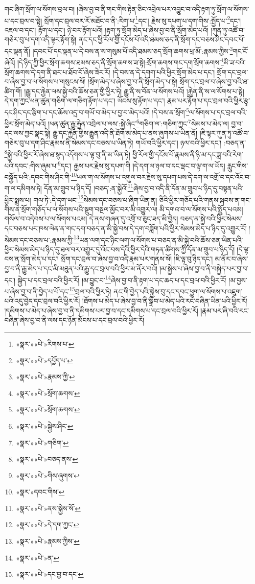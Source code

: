 གང་ཞིག་སྲོག་ལ་སོགས་བྲལ་བ། །ཞེས་བྱ་བ་ནི་གང་གིས་རྟེན་ཅིང་འབྲེལ་པར་འབྱུང་བ་འདི་རྟག་ཏུ་སྲོག་ལ་སོགས་པ་དང་བྲལ་བ་སྟེ། སྲོག་དང་བྲལ་བར་རོ་མཐོང་བ་ནི་:རིག་པ་\footnote{«སྣར་»«པེ་»རིགས་པ་}དང་། རྗེས་སུ་དཔག་པ་དག་གིས་:སྤྱོད་པ་\footnote{«སྣར་»«པེ་»དཔྱོད་པ་}དང་། འཇལ་བ་དང་། རྟོག་པ་དང་། ཉེ་བར་རྟོག་པའོ། །རྟག་ཏུ་སྲོག་མེད་པ་ཞེས་བྱ་བ་ནི་སྲོག་མེད་པའོ། །ཀུན་ཏུ་འཚོ་བ་གཅེར་བུ་པ་དག་འདི་ལྟར་རྟོག་སྟེ། ནང་དང་ཕྱི་རོལ་གྱི་དངོས་པོ་འདི་ཐམས་ཅད་ནི་སྲོག་དང་བཅས་ཤིང་དབང་པོ་དང་ལྡན་ནོ། །དབང་པོ་དང་ལྡན་པ་དེ་བས་ན་ས་གསུམ་པོ་འདི་ཐམས་ཅད་སྲོག་ཆགས་ཕྲ་མོ་:རྣམས་ཀྱིས་\footnote{«སྣར་»«པེ་»རྣམས་ཀྱི་}གང་ངོ་ཞེའོ། །དེ་ཉིད་ཀྱི་ཕྱིར་སྲོག་ཆགས་ཐམས་ཅད་ནི་སྲོག་ཆགས་ཟ་སྟེ།:སྲོག་ཆགས་གང་དག་སྲོག་ཆགས་\footnote{«སྣར་»«པེ་»སྲོག་ཆགས་}མི་ཟ་བའི་སྲོག་ཆགས་དེ་དག་ནི་ཐར་པ་ཐོབ་བོ་ཞེས་ཟེར་རོ། །དེ་བས་ན་དེ་དགག་པའི་ཕྱིར་སྲོག་མེད་པ་དང་། སྲོག་དང་བྲལ་བ་ཞེས་བྱ་བ་ལ་སོགས་པ་གསུངས་སོ། །སྲོག་མེད་པ་ཞེས་བྱ་བ་ནི་སྲོག་མེད་པ་སྟེ། སྲོག་དང་བྲལ་བ་ཞེས་བྱ་བའི་ཐ་ཚིག་གོ། །རྒྱུ་དང་རྐྱེན་ལས་སྐྱེ་བའི་ཆོས་ཅན་གྱི་ཕྱིར་ཏེ། རྒྱུ་ནི་ས་བོན་ལ་སོགས་པའོ། །རྐྱེན་ནི་ས་ལ་སོགས་པ་སྟེ། དེ་དག་ཀྱང་ཕན་ཚུན་གཅིག་ལ་གཅིག་རྟོག་པ་དང་། ཡོངས་སུ་རྟོག་པ་དང་། རྣམ་པར་རྟོག་པ་དང་བྲལ་བའི་ཕྱིར་རྩྭ་དང་ཤིང་དང་རྩིག་པ་དང་ཆོས་འདྲ་བ་གཡོ་བ་མེད་པ་བྱ་བ་མེད་པའོ། །དེ་བས་ན་སྲོག་\footnote{«སྣར་»«པེ་»སྲོག་ཆགས་}ལ་སོགས་པ་དང་བྲལ་བའི་ཕྱིར་སྲོག་མེད་པའོ། །ཕན་ཚུན་རྒྱུ་རྐྱེན་འབྲེལ་པ་ལས་:སྐྱེ་ཞིང་\footnote{«སྣར་»«པེ་»སྐྱེས་ཤིང་}གཅིག་ལ་:གཅིག་ཀྱང་\footnote{«སྣར་»«པེ་»གཅིག་}སེམས་པ་མེད་ལ། བྱ་བ་དང་ལས་ཀྱང་སྣང་སྟེ། རྒྱུ་དང་རྐྱེན་གྱིས་རྒྱུན་འདི་ནི་ཐོག་མ་མེད་པ་ནས་ཞུགས་པ་ཡིན་ནོ། །ཇི་ལྟར་ཀུན་ཏུ་འཚོ་བ་གཅེར་བུ་པ་དག་ཤིང་རྣམས་ནི་སེམས་དང་བཅས་པ་ཡིན་ཏེ། གཡོ་བའི་ཕྱིར་དང་། ཉལ་བའི་ཕྱིར་དང་། :བཅད་ན་\footnote{«སྣར་»«པེ་»བཅད་ནས་}སྐྱེ་བའི་ཕྱིར་རོ་ཞེས་ཐ་སྙད་འདོགས་པ་ལྟ་བུ་ནི་མ་ཡིན་ཏེ། ཕྱི་རོལ་གྱི་དངོས་པོ་རྣམས་ནི་ཉི་མ་དང་ཟླ་བའི་རེག་པའི་དབང་:གིས་ཞུམ་པ་\footnote{«སྣར་»«པེ་»གིས་ཞུགས་}དང་། རྒྱས་པར་རྗེས་སུ་དཔག་གི །དེ་དག་ལ་ཉལ་བ་དང་ལྡང་བ་ལྟ་ག་ལ་ཡོད། རླུང་གིས་བསྐྱོད་པའི་:དབང་གིས་ཤིང་གི་\footnote{«སྣར་»དབང་གིས་}ཡལ་ག་ལ་སོགས་པ་འགུལ་བར་རྗེས་སུ་དཔག་པས་དེ་དག་ལ་འགྲོ་བ་དང་འོང་བ་ག་ལ་དམིགས་ཏེ། དོན་མ་གྲུབ་པ་ཉིད་དོ། །བཅད་:ན་སྐྱེའོ་\footnote{«སྣར་»«པེ་»ནས་སྐྱེས་སོ་}ཞེས་བྱ་བ་འདི་ནི་དོན་མ་གྲུབ་པ་ཉིད་དུ་བསྟན་པའི་ཕྱིར་སྨྲས་པ། གལ་ཏེ་:དེ་དག་ཡང་\footnote{«སྣར་»«པེ་»དེ་དག་ཀྱང་}སེམས་དང་བཅས་པ་ཞིག་ཡིན་ན། ཅིའི་ཕྱིར་གཅོད་པའི་གནས་སྐབས་ན་གང་གིས་ན་སྲོག་གཅོད་པ་ལ་སོགས་པའི་སྡུག་བསྔལ་མྱོང་བར་མི་འགྱུར་ལ། མི་དགའ་བ་ལ་སོགས་པའི་སྤྱོད་པའམ། གསོལ་བ་འདེབས་པ་ལ་སོགས་པའམ། དེ་ནས་གཞན་དུ་འགྲོ་བ་ཅུང་ཟད་མི་བྱེད། བཅད་ན་སྐྱེ་བའི་ཕྱིར་སེམས་དང་བཅས་པར་ཁས་ལེན་ན་གང་དག་བཅད་ན་མི་སྐྱེ་བས་དེ་དག་བཟློག་པའི་ཕྱིར་སེམས་མེད་པ་ཉིད་དུ་འགྱུར་རོ། །སེམས་དང་བཅས་པ་:རྣམས་ཀྱི་\footnote{«སྣར་»«པེ་»རྣམས་ཀྱིས་}ཡན་ལག་དང་ཉིང་ལག་ལ་སོགས་པ་བཅད་ན་མི་སྐྱེ་བའི་ཆོས་ཅན་ཡིན་པའི་ཕྱིར་སེམས་མེད་པ་ཉིད་དུ་ཐལ་བར་འགྱུར་དུ་འོང་བས་དེའི་ཕྱིར་དེའི་གཏན་ཚིགས་ཀྱི་དོན་མ་གྲུབ་པ་ཉིད་དོ། །དེ་ལྟ་བས་ན་སྲོག་མེད་པ་དང་། སྲོག་དང་བྲལ་བ་ཞེས་བྱ་བ་འདི་རྣམ་པར་གནས་སོ། །ཇི་ལྟ་བུ་ཉིད་དང་། མ་ནོར་བ་ཞེས་བྱ་བ་ནི་རྒྱུ་མེད་པ་དང་མི་མཐུན་པའི་རྒྱུ་དང་བྲལ་བའི་ཕྱིར་མ་ནོར་བའོ། །མ་སྐྱེས་པ་ཞེས་བྱ་བ་ནི་བསྐྱེད་པར་བྱ་བ་དང་། སྐྱེད་པ་དང་བྲལ་བའི་ཕྱིར་རོ། །མ་བྱུང་བ་\footnote{«སྣར་»«པེ་»ན་}ཞེས་བྱ་བ་ནི་རྟག་པ་དང་ཆད་པ་དང་བྲལ་བའི་ཕྱིར་རོ། །མ་བྱས་པ་ཞེས་བྱ་བ་ནི་བྱེད་པ་པོ་དང་\footnote{«སྣར་»«པེ་»དང་བྱ་བ་དང་}བྲལ་བའི་ཕྱིར་ཏེ། ནང་གི་བྱེད་པའི་སྐྱེས་བུ་དང་དབང་ཕྱུག་ལ་སོགས་པ་འཇུག་པའི་འདུ་བྱེད་དང་བྲལ་བའི་ཕྱིར་རོ། །ཐོགས་པ་མེད་པ་ཞེས་བྱ་བ་ནི་སྒྲིབ་པ་མེད་པའི་རང་བཞིན་ཡིན་པའི་ཕྱིར་རོ། །དམིགས་པ་མེད་པ་ཞེས་བྱ་བ་ནི་དམིགས་པར་བྱ་བ་དང་དམིགས་པ་དང་བྲལ་བའི་ཕྱིར་རོ། །རྣམ་པར་ཞི་བའི་རང་བཞིན་ཞེས་བྱ་བ་ནི་ལས་དང་ཉོན་མོངས་པ་དང་བྲལ་བའི་ཕྱིར་རོ། 